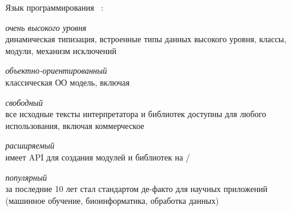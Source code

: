 \label{py}\secdown

\clearpage\noindent
Язык программирования \py\ \cite{py}:
\begin{description}[nosep]
    \item{\emph{очень высокого уровня}}\ \\динамическая типизация, встроенные типы данных высокого уровня, классы, модули, механизм исключений
    \item{\emph{объектно-ориентированный}}\ \\классическая ОО модель, включая 
    \item{\emph{свободный}}\ \\все исходные тексты интерпретатора и библиотек доступны для любого использования, включая коммерческое
    \item{\emph{расширяемый}}\ \\имеет API для создания модулей и библиотек на \ci/\cpp
    \item{\emph{популярный}}\ \\за последние 10 лет стал стандартом де-факто для научных приложений (машинное обучение, биоинформатика,
    обработка данных)
\end{description}




\secup
